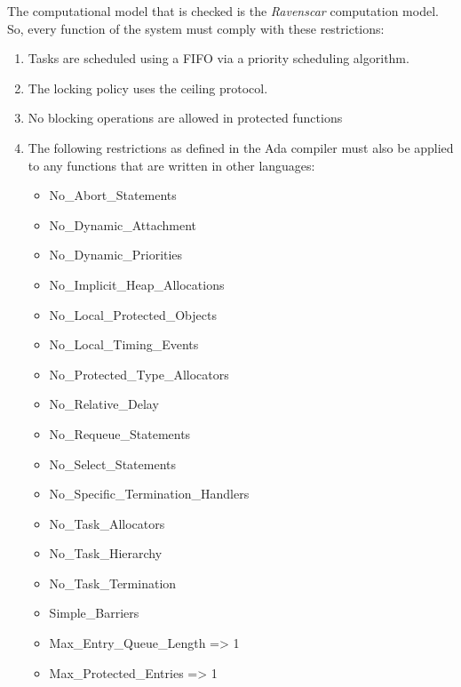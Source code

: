 \documentclass[11pt]{book}
\begin{document}
   The computational model that is checked is the \textit{Ravenscar} computation
   model. So, every function of the system must comply with these restrictions:
   \begin{enumerate}
      \item
         Tasks are scheduled using a FIFO via a priority scheduling
         algorithm.

      \item
         The locking policy uses the ceiling protocol.

      \item
         No blocking operations are allowed in protected functions
      \item
         The following restrictions as defined in the Ada compiler must also be
         applied to any functions that are written in other languages:
         \begin{itemize}
            \item
                No\_Abort\_Statements
            \item
                No\_Dynamic\_Attachment
            \item
                No\_Dynamic\_Priorities
            \item
                No\_Implicit\_Heap\_Allocations
            \item
                No\_Local\_Protected\_Objects
            \item
                No\_Local\_Timing\_Events
            \item
                No\_Protected\_Type\_Allocators
            \item
                No\_Relative\_Delay
            \item
                No\_Requeue\_Statements
            \item
                No\_Select\_Statements
            \item
                No\_Specific\_Termination\_Handlers
            \item
                No\_Task\_Allocators
            \item
                No\_Task\_Hierarchy
            \item
                No\_Task\_Termination
            \item
                Simple\_Barriers
            \item
                Max\_Entry\_Queue\_Length => 1
            \item
                Max\_Protected\_Entries  => 1

\end{itemize}
\end{enumerate}
\end{document}
